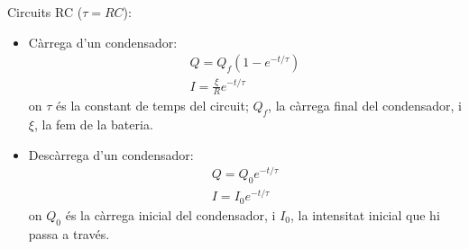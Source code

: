 \documentclass[class=article,10pt,crop=false]{standalone}
\begin{document}
\begin{multicols}{2}
\begin{enumerate}
\end{enumerate}
Circuits RC ($\tau=RC$):
\begin{itemize}
    \item Càrrega d'un condensador:
    \begin{gather*}
        Q=Q_f(1-e^{-t/\tau})\\
        I=\frac{\xi}{R}e^{-t/\tau}
    \end{gather*}
    {on $\tau$ és la constant de temps del circuit; $Q_f$, la càrrega final del condensador, i $\xi$, la fem de la bateria.}
    \item Descàrrega d'un condensador:
    \begin{gather*}
        Q=Q_0e^{-t/\tau}\\
        I=I_0e^{-t/\tau}
    \end{gather*}
    {on $Q_0$ és la càrrega inicial del condensador, i $I_0$, la intensitat inicial que hi passa a través.}\textbf{}
\end{itemize}

\end{multicols}
\end{document}
